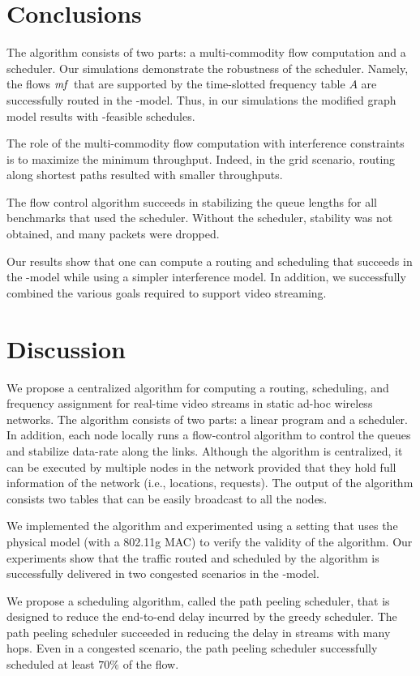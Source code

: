 \documentclass[11pt]{article}
\newenvironment{proof sketch}[1]{\noindent {\emph{Proof sketch of #1:}}}{\hfill \qed}
\newcommand{\SINR}{\text{\sc{sinr}}}
\newcommand{\mf}{\text{\emph{mf}}}
\begin{document}
\section{Conclusions}
The algorithm consists of two parts: a multi-commodity flow
computation and a scheduler.  Our simulations demonstrate the
robustness of the scheduler.  Namely, the flows $\mf$ that are
supported by the time-slotted frequency table $A$ are successfully
routed in the \SINR-model. Thus, in our simulations the modified graph
model results with \SINR-feasible schedules.

The role of the multi-commodity flow computation with interference
constraints is to maximize the minimum throughput. Indeed, in the grid
scenario, routing along shortest paths resulted with smaller
throughputs.

The flow control algorithm succeeds in stabilizing the queue lengths
for all benchmarks that used the scheduler. Without the scheduler,
stability was not obtained, and many packets were dropped.

Our results show that one can compute a routing and scheduling that
succeeds in the \SINR-model while using a simpler interference model.
In addition, we successfully combined the various goals required to
support video streaming.

\section{Discussion}
We propose a centralized algorithm for computing a routing,
scheduling, and frequency assignment for real-time video streams in
static ad-hoc wireless networks.  The algorithm consists of two parts:
a linear program and a scheduler.  In addition, each node locally runs
a flow-control algorithm to control the queues and stabilize data-rate
along the links.  Although the algorithm is centralized, it can be
executed by multiple nodes in the network provided that they hold full
information of the network (i.e., locations, requests).  The output of
the algorithm consists two tables that can be easily broadcast to all
the nodes.

We implemented the algorithm and experimented using a setting that
uses the physical model (with a 802.11g MAC) to verify the validity of
the algorithm.  Our experiments show that the traffic routed and
scheduled by the algorithm is successfully delivered in two congested
scenarios in the \SINR-model.

We propose a scheduling algorithm, called the path peeling scheduler,
that is designed to reduce the end-to-end delay incurred by the greedy
scheduler. The path peeling scheduler succeeded in reducing the delay
in streams with many hops. Even in a congested scenario, the path
peeling scheduler successfully scheduled at least $70\%$ of the flow.
\end{document}
